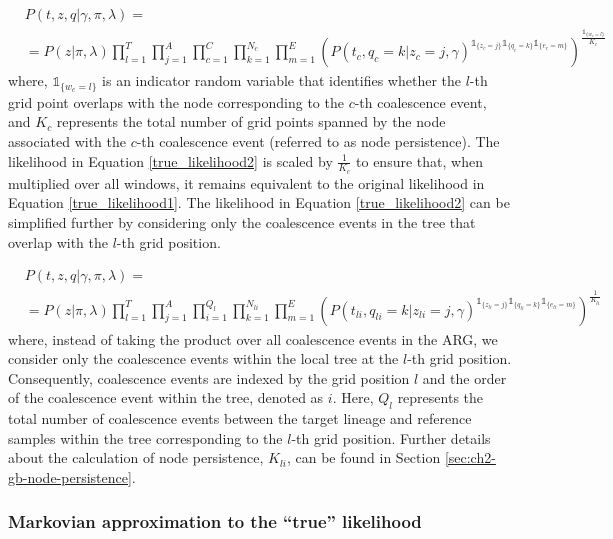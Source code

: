 \begingroup
\footnotesize
\begin{align}
    &P(t,z,q \vert \gamma, \pi, \lambda) = \nonumber \\
    & = P(z \vert \pi, \lambda) \prod_{l =1}^{T} \prod_{j = 1}^A \prod_{c=1}^{C} \prod_{k =1}^{N_c} \prod_{m = 1}^E \left( P(t_c,q_c=k \vert z_c = j, \gamma)^{\mathds{1}_{\{z_c = j\}} \mathds{1}_{\{q_c = k\}} \mathds{1}_{\{e_c = m\}}} \right) ^{\frac{\mathds{1}_{\{w_c = l\}}}{K_c}} 
\label{true_likelihood2}
\end{align}
\endgroup
where, $\mathds{1}_{\{w_c = l\}}$ is an indicator random variable that identifies whether the $l$-th grid point overlaps with the node corresponding to the $c$-th coalescence event, and $K_c$ represents the total number of grid points spanned by the node associated with the $c$-th coalescence event (referred to as node persistence). The likelihood in Equation \ref{true_likelihood2} is scaled by $\frac{1}{K_c}$ to ensure that, when multiplied over all windows, it remains equivalent to the original likelihood in Equation \ref{true_likelihood1}. The likelihood in Equation \ref{true_likelihood2} can be simplified further by considering only the coalescence events in the tree that overlap with the $l$-th grid position.

\begingroup
\footnotesize
\begin{align}
    &P(t,z,q \vert \gamma, \pi, \lambda) = \nonumber \\
    & = P(z \vert \pi, \lambda) \prod_{l =1}^{T} \prod_{j = 1}^A \prod_{i=1}^{Q_l} \prod_{k =1}^{N_{li}} \prod_{m = 1}^E \left( P(t_{li},q_{li}=k \vert z_{li} = j, \gamma)^{\mathds{1}_{\{z_{li} = j\}} \mathds{1}_{\{q_{li} = k\}} \mathds{1}_{\{e_{li} = m\}}} \right) ^{\frac{1}{K_{li}}}
\label{true_likelihood3}
\end{align}
\endgroup
where, instead of taking the product over all coalescence events in the ARG, we consider only the coalescence events within the local tree at the $l$-th grid position. Consequently, coalescence events are indexed by the grid position $l$ and the order of the coalescence event within the tree, denoted as $i$. Here, $Q_l$ represents the total number of coalescence events between the target lineage and reference samples within the tree corresponding to the $l$-th grid position. Further details about the calculation of node persistence, $K_{li}$, can be found in Section \ref{sec:ch2-gb-node-persistence}.

\subsubsection{Markovian approximation to the ``true'' likelihood}

